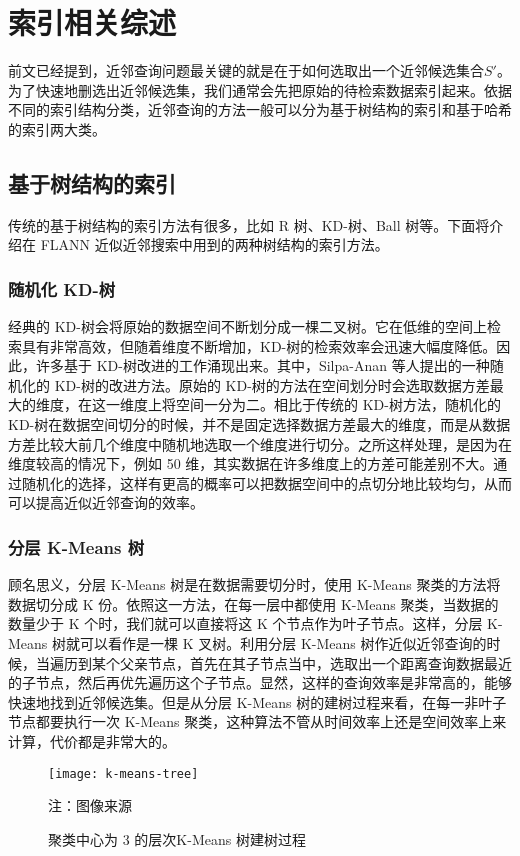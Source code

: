 

\chapter{索引相关综述}
\label{cha:related-work}
前文已经提到，近邻查询问题最关键的就是在于如何选取出一个近邻候选集合$S'$。为了快速地删选出近邻候选集，我们通常会先把原始的待检索数据索引起来。依据
不同的索引结构分类，近邻查询的方法一般可以分为基于树结构的索引和基于哈希的索引两大类。
\section{基于树结构的索引}
传统的基于树结构的索引方法有很多，比如 R 树、KD-树、Ball 树等。下面将介绍在 FLANN\cite{muja_flann_2009} 近似近邻搜索中用到的两种树结构的索引方法。
\subsection{随机化 KD-树}
经典的 KD-树会将原始的数据空间不断划分成一棵二叉树。它在低维的空间上检索具有非常高效，但随着维度不断增加，KD-树的检索效率会迅速大幅度降低。因此，许多基于 KD-树改进的工作涌现出来。其中，Silpa-Anan 等人提出的一种随机化的 KD-树\cite{Silpa-AnanH08}的改进方法。原始的 KD-树的方法在空间划分时会选取数据方差最大的维度，在这一维度上将空间一分为二。相比于传统的 KD-树方法，随机化的 KD-树在数据空间切分的时候，并不是固定选择数据方差最大的维度，而是从数据方差比较大前几个维度中随机地选取一个维度进行切分。之所这样处理，是因为在维度较高的情况下，例如 50 维，其实数据在许多维度上的方差可能差别不大。通过随机化的选择，这样有更高的概率可以把数据空间中的点切分地比较均匀，从而可以提高近似近邻查询的效率。
\subsection{分层 K-Means 树}
顾名思义，分层 K-Means 树\cite{Nister:2006}是在数据需要切分时，使用 K-Means 聚类的方法将数据切分成 K 份。依照这一方法，在每一层中都使用 K-Means 聚类，当数据的数量少于 K 个时，我们就可以直接将这 K 个节点作为叶子节点。这样，分层 K-Means 树就可以看作是一棵 K 叉树。利用分层 K-Means 树作近似近邻查询的时候，当遍历到某个父亲节点，首先在其子节点当中，选取出一个距离查询数据最近的子节点，然后再优先遍历这个子节点。显然，这样的查询效率是非常高的，能够快速地找到近邻候选集。但是从分层 K-Means 树的建树过程来看，在每一非叶子节点都要执行一次 K-Means 聚类，这种算法不管从时间效率上还是空间效率上来计算，代价都是非常大的。
\begin{figure}[H]
  \centering
  \texttt{[image: k-means-tree]}
  \caption{聚类中心为 3 的层次K-Means 树建树过程}
  \label{fig:k-means-tree}
  \footnotesize 注：图像来源\cite{Nister:2006}
\end{figure}
